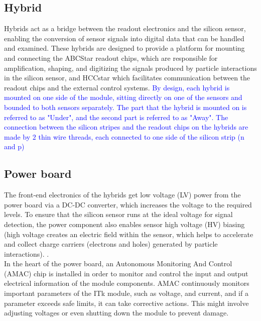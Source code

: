 
\subsection{Hybrid}
Hybrids act as a bridge between the readout electronics and the silicon sensor, enabling the conversion of sensor signals into digital data that can be handled and examined. These hybrids are designed to provide a platform for mounting and connecting the ABCStar readout chips, which are responsible for amplification, shaping, and digitizing the signals produced by particle interactions in the silicon sensor, and HCCstar which facilitates communication between the readout chips and the external control systems. \textcolor{blue}{By design, each hybrid is mounted on one side of the module, sitting directly on one of the sensors and bounded to both sensors separately. The part that the hybrid is mounted on is referred to as "Under", and the second part is referred to as "Away". The connection between the silicon stripes and the readout chips on the hybrids are made by $2$ thin wire threads, each connected to one side of the silicon strip (n and p)}  \\


\subsection{Power board}
The front-end electronics of the hybrids get low voltage (LV) power from the power board via a DC-DC converter, which increases the voltage to the required levels. To ensure that the silicon sensor runs at the ideal voltage for signal detection, the power component also enables sensor high voltage (HV) biasing\cite{sykora2019itk} (high voltage creates an electric field within the sensor, which helps to accelerate and collect charge carriers (electrons and holes) generated by particle interactions). \cite{Collaboration:390920}. \\
In the heart of the power board, an Autonomous Monitoring And Control (AMAC) chip is installed in order to monitor and control the input and output electrical information of the module components. AMAC continuously monitors important parameters of the ITk module, such as voltage, and current, and if a parameter exceeds safe limits, it can take corrective actions. This might involve adjusting voltages or even shutting down the module to prevent damage.

